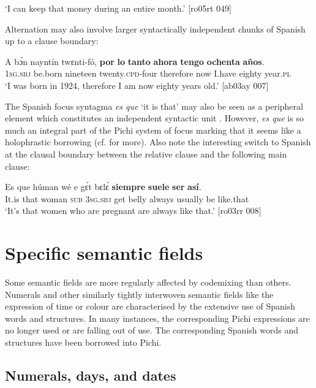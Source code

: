 \glt ‘I can keep that money during an entire month.’ [ro05rt 049]
\z

Alternation may also involve larger syntactically independent chunks of Spanish up to a clause boundary: 


\ea%
    \label{ex:key:1739}
    \gll A    bɔ́n    nayntín    twɛnti-fó,    {\textbf{por} \textbf{lo} \textbf{tanto}}
\textbf{ahora}  \textbf{tengo}  \textbf{ochenta}  \textbf{años}.\\
\textsc{1sg.sbj}  be.born  nineteen    twenty.\textsc{cpd}{}-four  therefore
now    I.have  eighty  year.\textsc{pl}\\

\glt ‘I was born in 1924, therefore I am now eighty years old.’ [ab03ay 007]
\z

The Spanish focus syntagma \textit{es que} ‘it is that’ may also be seen as a peripheral element which constitutes an independent syntactic unit . However, \textit{es que} is so much an integral part of the Pichi system of focus marking that it seems like a holophrastic borrowing (cf.  for more). Also note the interesting switch to Spanish at the clausal boundary between the relative clause and the following main clause: 


\ea%
    \label{ex:key:1740}
    \gll Es  que    húman  wé  e    gɛ́t  bɛlɛ́  
\textbf{siempre}  \textbf{suele}  \textbf{ser}  \textbf{así}.\\
It.is  that    woman  \textsc{sub}  \textsc{3sg.sbj}  get  belly
always  usually  be  like.that\\
\glt ‘It’s that women who are pregnant are always like that.’ [ro03rr 008]
\z

\section{Specific semantic fields}\label{sec:13.3}

Some semantic fields are more regularly affected by codemixing than others. Numerals and other similarly tightly interwoven semantic fields like the expression of time or colour are characterised by the extensive use of Spanish words and structures. In many instances, the corresponding Pichi expressions are no longer used or are falling out of use. The corresponding Spanish words and structures have been borrowed into Pichi. 

\subsection{Numerals, days, and dates}\label{sec:13.3.1}

